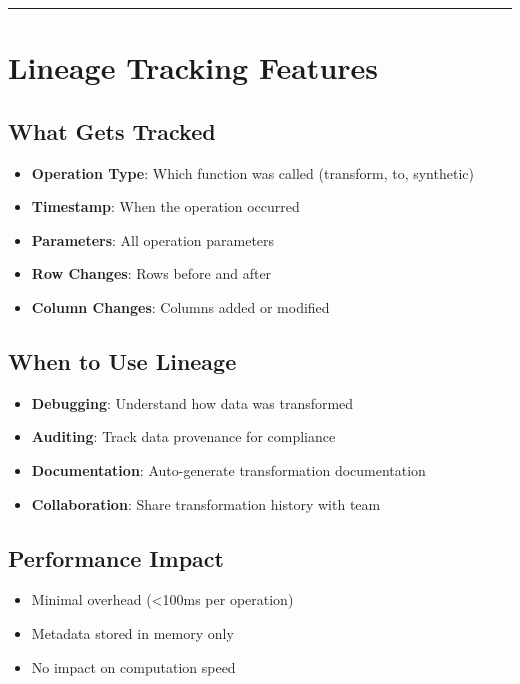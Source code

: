 \documentclass[
  letterpaper,
]{scrbook}
\providecommand{\tightlist}{%
  \setlength{\itemsep}{0pt}\setlength{\parskip}{0pt}}
\begin{document}
\begin{center}\rule{0.5\linewidth}{0.5pt}\end{center}

\section{Lineage Tracking Features}\label{lineage-tracking-features}

\subsection{What Gets Tracked}\label{what-gets-tracked}

\begin{itemize}
\tightlist
\item
  \textbf{Operation Type}: Which function was called (transform, to,
  synthetic)
\item
  \textbf{Timestamp}: When the operation occurred
\item
  \textbf{Parameters}: All operation parameters
\item
  \textbf{Row Changes}: Rows before and after
\item
  \textbf{Column Changes}: Columns added or modified
\end{itemize}

\subsection{When to Use Lineage}\label{when-to-use-lineage}

\begin{itemize}
\tightlist
\item
  \textbf{Debugging}: Understand how data was transformed
\item
  \textbf{Auditing}: Track data provenance for compliance
\item
  \textbf{Documentation}: Auto-generate transformation documentation
\item
  \textbf{Collaboration}: Share transformation history with team
\end{itemize}

\subsection{Performance Impact}\label{performance-impact}

\begin{itemize}
\tightlist
\item
  Minimal overhead (\textless100ms per operation)
\item
  Metadata stored in memory only
\item
  No impact on computation speed
\end{itemize}
\end{document}
